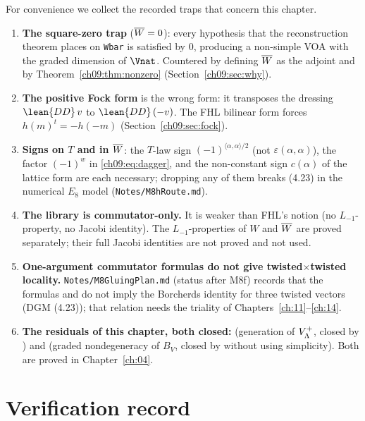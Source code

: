 For convenience we collect the recorded traps that concern this chapter.
\begin{enumerate}
\item \textbf{The square-zero trap} ($\overline{W}=0$): every hypothesis that the reconstruction
theorem places on \texttt{Wbar} is satisfied by $0$, producing a non-simple VOA with the graded
dimension of $\Vnat$. Countered by defining $\overline{W}$ as the adjoint and by
Theorem~\ref{ch09:thm:nonzero} (Section~\ref{ch09:sec:why}).
\item \textbf{The positive Fock form} is the wrong form: it transposes the dressing
$\lean{DD}\,v$ to $\lean{DD}\,(-v)$. The FHL bilinear form forces $h(m)^t=-h(-m)$
(Section~\ref{ch09:sec:fock}).
\item \textbf{Signs on $T$ and in $\overline{W}$}: the $T$-law sign $(-1)^{\langle\alpha,\alpha\rangle/2}$
(not $\varepsilon(\alpha,\alpha)$), the factor $(-1)^w$ in \eqref{ch09:eq:dagger}, and the non-constant
sign $c(\alpha)$ of the lattice form are each necessary; dropping any of them breaks (4.23) in the
numerical $E_8$ model (\texttt{Notes/M8hRoute.md}).
\item \textbf{The library  is commutator-only.} It is weaker than FHL's notion
(no $L_{-1}$-property, no Jacobi identity). The $L_{-1}$-properties of $W$ and $\overline{W}$ are proved
separately; their full Jacobi identities are not proved and not used.
\item \textbf{One-argument commutator formulas do not give twisted$\times$twisted locality.}
\texttt{Notes/M8GluingPlan.md} (status after M8f) records that the formulas
 and  do not imply the Borcherds identity for three twisted
vectors (DGM (4.23)); that relation needs the triality of Chapters~\ref{ch:11}--\ref{ch:14}.
\item \textbf{The residuals of this chapter, both closed:}  (generation of $V_{\Lambda}^{+}$,
closed by ) and  (graded nondegeneracy of $B_V$, closed by
 without using simplicity). Both are proved in Chapter~\ref{ch:04}.
\end{enumerate}

\section{Verification record}\label{ch09:sec:verification}

